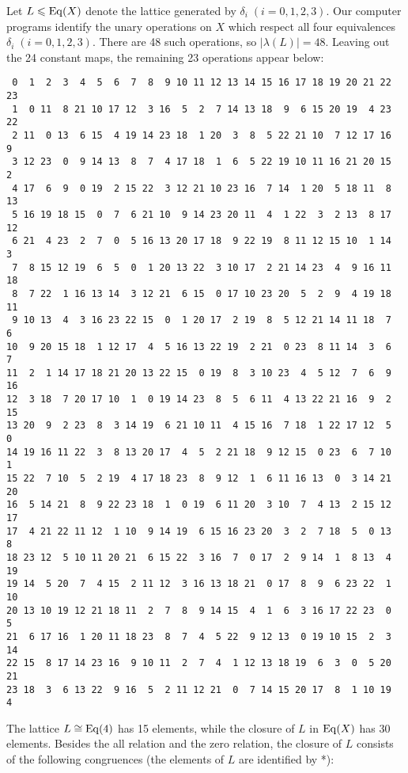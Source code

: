 \newpage
Let $L\leqslant \operatorname{Eq}(X)$ denote the lattice generated by $\delta_i\;(i=0,1,2,3)$. 
Our computer programs identify the unary operations on $X$ which respect all four 
equivalences $\delta_i\;(i=0,1,2,3)$.  There are 48 such operations, 
so $|\lambda(L)| = 48$.  Leaving out the 24 constant maps, the
remaining 23 operations appear below:
{\small
\begin{verbatim}
 0  1  2  3  4  5  6  7  8  9 10 11 12 13 14 15 16 17 18 19 20 21 22 23
 1  0 11  8 21 10 17 12  3 16  5  2  7 14 13 18  9  6 15 20 19  4 23 22
 2 11  0 13  6 15  4 19 14 23 18  1 20  3  8  5 22 21 10  7 12 17 16  9
 3 12 23  0  9 14 13  8  7  4 17 18  1  6  5 22 19 10 11 16 21 20 15  2
 4 17  6  9  0 19  2 15 22  3 12 21 10 23 16  7 14  1 20  5 18 11  8 13
 5 16 19 18 15  0  7  6 21 10  9 14 23 20 11  4  1 22  3  2 13  8 17 12
 6 21  4 23  2  7  0  5 16 13 20 17 18  9 22 19  8 11 12 15 10  1 14  3
 7  8 15 12 19  6  5  0  1 20 13 22  3 10 17  2 21 14 23  4  9 16 11 18
 8  7 22  1 16 13 14  3 12 21  6 15  0 17 10 23 20  5  2  9  4 19 18 11
 9 10 13  4  3 16 23 22 15  0  1 20 17  2 19  8  5 12 21 14 11 18  7  6
10  9 20 15 18  1 12 17  4  5 16 13 22 19  2 21  0 23  8 11 14  3  6  7
11  2  1 14 17 18 21 20 13 22 15  0 19  8  3 10 23  4  5 12  7  6  9 16
12  3 18  7 20 17 10  1  0 19 14 23  8  5  6 11  4 13 22 21 16  9  2 15
13 20  9  2 23  8  3 14 19  6 21 10 11  4 15 16  7 18  1 22 17 12  5  0
14 19 16 11 22  3  8 13 20 17  4  5  2 21 18  9 12 15  0 23  6  7 10  1
15 22  7 10  5  2 19  4 17 18 23  8  9 12  1  6 11 16 13  0  3 14 21 20
16  5 14 21  8  9 22 23 18  1  0 19  6 11 20  3 10  7  4 13  2 15 12 17
17  4 21 22 11 12  1 10  9 14 19  6 15 16 23 20  3  2  7 18  5  0 13  8
18 23 12  5 10 11 20 21  6 15 22  3 16  7  0 17  2  9 14  1  8 13  4 19
19 14  5 20  7  4 15  2 11 12  3 16 13 18 21  0 17  8  9  6 23 22  1 10
20 13 10 19 12 21 18 11  2  7  8  9 14 15  4  1  6  3 16 17 22 23  0  5
21  6 17 16  1 20 11 18 23  8  7  4  5 22  9 12 13  0 19 10 15  2  3 14
22 15  8 17 14 23 16  9 10 11  2  7  4  1 12 13 18 19  6  3  0  5 20 21
23 18  3  6 13 22  9 16  5  2 11 12 21  0  7 14 15 20 17  8  1 10 19  4
\end{verbatim}
}
\newpage
The lattice $L\cong \operatorname{Eq}(4)$ has 15 elements, while the closure of $L$ in $\operatorname{Eq}(X)$ has
30 elements.  Besides the all relation and the zero relation, the closure of $L$
consists of the following congruences (the elements of $L$ are identified by *):

